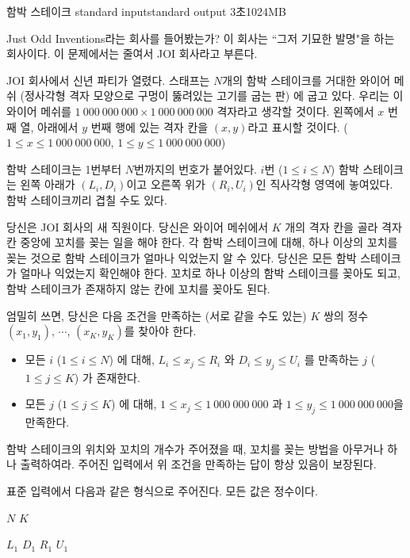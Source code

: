 \begin{problem}{함박 스테이크}
	{standard input}{standard output}
	{3초}{1024MB}{}
	
	Just Odd Inventions라는 회사를 들어봤는가? 이 회사는 ``그저 기묘한 발명"을 하는 회사이다. 이 문제에서는 줄여서 JOI 회사라고 부른다.
	 
	JOI 회사에서 신년 파티가 열렸다. 스태프는 $N$개의 함박 스테이크를 거대한 와이어 메쉬 (정사각형 격자 모양으로 구멍이 뚫려있는 고기를 굽는 판) 에 굽고 있다. 우리는 이 와이어 메쉬를 $1\ 000\ 000\ 000 \times 1\ 000\ 000\ 000$ 격자라고 생각할 것이다. 왼쪽에서 $x$ 번째 열, 아래에서 $y$ 번째 행에 있는 격자 칸을 $(x, y)$라고 표시할 것이다. ($1 \le x \le 1\ 000\ 000\ 000$, $1 \le y \le 1\ 000\ 000\ 000$)
	
	함박 스테이크는 1번부터 $N$번까지의 번호가 붙어있다. $i$번 ($1 \le i \le N$) 함박 스테이크는 왼쪽 아래가 $(L_i, D_i)$이고 오른쪽 위가 $(R_i, U_i)$인 직사각형 영역에 놓여있다. 함박 스테이크끼리 겹칠 수도 있다.
	
	당신은 JOI 회사의 새 직원이다. 당신은 와이어 메쉬에서 $K$ 개의 격자 칸을 골라 격자 칸 중앙에 꼬치를 꽂는 일을 해야 한다. 각 함박 스테이크에 대해, 하나 이상의 꼬치를 꽂는 것으로 함박 스테이크가 얼마나 익었는지 알 수 있다. 당신은 모든 함박 스테이크가 얼마나 익었는지 확인해야 한다. 꼬치로 하나 이상의 함박 스테이크를 꽂아도 되고, 함박 스테이크가 존재하지 않는 칸에 꼬치를 꽂아도 된다.
	
	엄밀히 쓰면, 당신은 다음 조건을 만족하는 (서로 같을 수도 있는) $K$ 쌍의 정수 $(x_1, y_1)$, $\cdots$, $(x_K, y_K)$를 찾아야 한다.
	
	\begin{itemize}
		\item 모든 $i$ ($1 \le i \le N$) 에 대해, $L_i \le x_j \le R_i$ 와 $D_i \le y_j \le U_i$ 를 만족하는 $j$ ($1 \le j \le K$) 가 존재한다.
		\item 모든 $j$ ($1 \le j \le K$) 에 대해, $1 \le x_j \le 1\ 000\ 000\ 000$ 과 $1 \le y_j \le 1\ 000\ 000\ 000$을 만족한다.
	\end{itemize}

	함박 스테이크의 위치와 꼬치의 개수가 주어졌을 때, 꼬치를 꽂는 방법을 아무거나 하나 출력하여라. 주어진 입력에서 위 조건을 만족하는 답이 항상 있음이 보장된다.

	
\InputFile

표준 입력에서 다음과 같은 형식으로 주어진다. 모든 값은 정수이다.

$N$ $K$

$L_1$ $D_1$ $R_1$ $U_1$


\end{problem}

